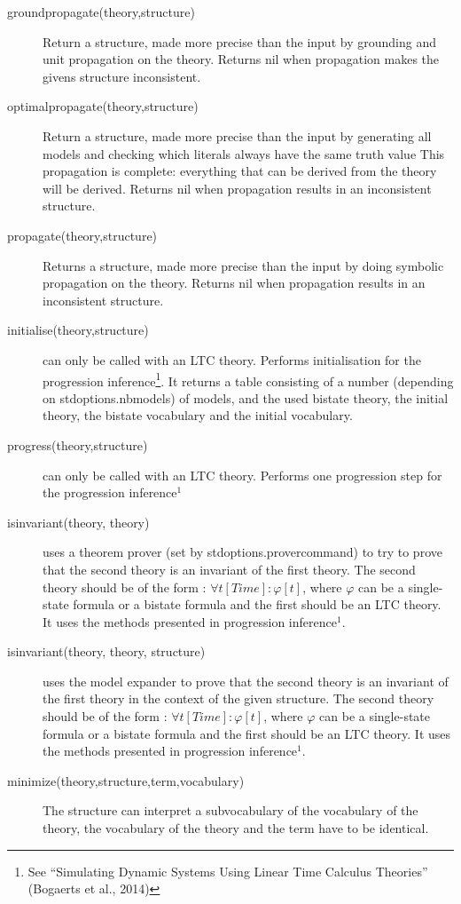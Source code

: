 \begin{description}
 	\item[groundpropagate(theory,structure)]
 		Return a structure, made more precise than the input by grounding and unit propagation on the theory.
		Returns nil when propagation makes the givens structure inconsistent.
	\item[optimalpropagate(theory,structure)]
 		Return a structure, made more precise than the input by generating all models and checking which literals always have the same truth value
 		This propagation is complete: everything that can be derived from the theory will be derived. 
 		Returns nil when propagation results in an inconsistent structure.
	\item[propagate(theory,structure)]
 		Returns a structure, made more precise than the input by doing symbolic propagation on the theory.
 		Returns nil when propagation results in an inconsistent structure.
 	\item[initialise(theory,structure)] can only be called with an LTC theory. Performs initialisation for the progression inference\footnote{See ``Simulating Dynamic Systems Using Linear Time Calculus Theories'' (Bogaerts et al., 2014)}.
	It returns a table consisting of a number (depending on stdoptions.nbmodels) of models, and the used bistate theory, the initial theory, the bistate vocabulary and the initial vocabulary.
 	\item[progress(theory,structure)] can only be called with an LTC theory. Performs one progression step for the progression inference$^1$ 
	\item[isinvariant(theory, theory)] uses a theorem prover (set by stdoptions.provercommand) to try to prove that the second theory is an invariant of the first theory. The second theory should be of the form : $\forall t[Time]:\varphi[t]$, where $\varphi$ can be a single-state formula or a bistate formula and the first should be an LTC theory. It uses the methods presented in progression inference$^1$.
	\item[isinvariant(theory, theory, structure)] uses the model expander to prove that the second theory is an invariant of the first theory in the context of the given structure. The second theory should be of the form : $\forall t[Time]:\varphi[t]$, where $\varphi$ can be a single-state formula or a bistate formula and the first should be an LTC theory. It uses the methods presented in progression inference$^1$.
	\item[minimize(theory,structure,term,vocabulary)]
	The structure can interpret a subvocabulary of the vocabulary of the theory, the vocabulary of the theory and the term have to be identical.

\end{description}
